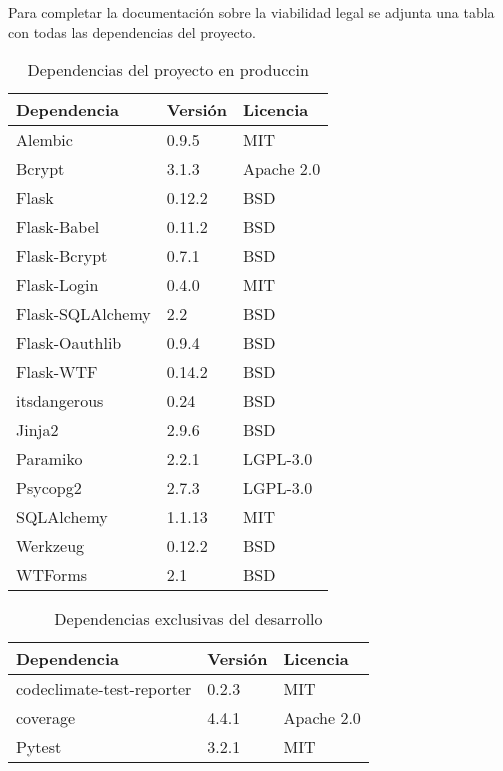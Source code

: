 Para completar la documentación sobre la viabilidad legal se adjunta una tabla con todas las dependencias del proyecto.
\FloatBarrier
\begin{table}[]
\centering
\begin{tabular}{lll}
\hline
Dependencia & Versión & Licencia \\ \hline
Alembic & 0.9.5 & MIT \\
Bcrypt & 3.1.3 & Apache 2.0 \\
Flask & 0.12.2 & BSD \\
Flask-Babel & 0.11.2 & BSD \\
Flask-Bcrypt & 0.7.1 & BSD \\
Flask-Login & 0.4.0 & MIT \\
Flask-SQLAlchemy & 2.2 & BSD \\
Flask-Oauthlib & 0.9.4 & BSD \\
Flask-WTF & 0.14.2 & BSD \\
itsdangerous & 0.24 & BSD \\
Jinja2 & 2.9.6 & BSD \\
Paramiko & 2.2.1 & LGPL-3.0 \\
Psycopg2 & 2.7.3 & LGPL-3.0 \\
SQLAlchemy &1.1.13 & MIT \\
Werkzeug & 0.12.2 & BSD \\
WTForms & 2.1 & BSD \\ \hline
\end{tabular}
\caption{Dependencias del proyecto en produccin}
\label{Dependencias en produccin}
\end{table}


\begin{table}[]
\centering
\begin{tabular}{lll}
\hline
Dependencia & Versión & Licencia \\ \hline
codeclimate-test-reporter & 0.2.3 & MIT \\
coverage & 4.4.1 & Apache 2.0 \\ 
Pytest & 3.2.1 & MIT \\ \hline
\end{tabular}
\caption{Dependencias exclusivas del desarrollo}
\label{Dependencias exclusivas en desarrollo}
\end{table}



